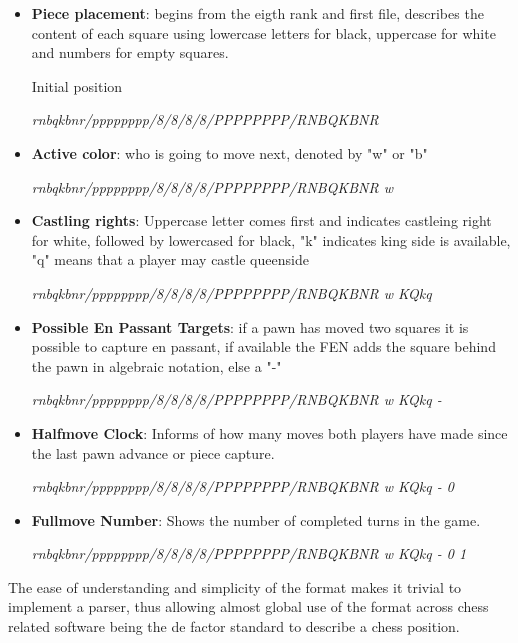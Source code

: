\begin{itemize}
    \item {
        \textbf{Piece placement}: begins from the eigth rank and first file, describes the content of each square using lowercase letters for black, uppercase for white and numbers for empty squares.
        \begin{center}Initial position\end{center}
        \begin{center}
        \textit{rnbqkbnr/pppppppp/8/8/8/8/PPPPPPPP/RNBQKBNR}                    
        \end{center}
    }
    \item {
        \textbf{Active color}: who is going to move next, denoted by "w" or "b"
        \begin{center}
        \textit{rnbqkbnr/pppppppp/8/8/8/8/PPPPPPPP/RNBQKBNR w}                    
        \end{center}
    }
    \item {
        \textbf{Castling rights}: Uppercase letter comes first and indicates castleing right for white, followed by lowercased for black, "k" indicates king side is available, "q" means that a player may castle queenside
        \begin{center}
        \textit{rnbqkbnr/pppppppp/8/8/8/8/PPPPPPPP/RNBQKBNR w KQkq}                    
        \end{center}
    }
    \item {
        \textbf{Possible En Passant Targets}: if a pawn has moved two squares it is possible to capture en passant, if available the FEN adds the square behind the pawn in algebraic notation, else a "-"
        \begin{center}
        \textit{rnbqkbnr/pppppppp/8/8/8/8/PPPPPPPP/RNBQKBNR w KQkq -}                    
        \end{center}
    }
    \item {
        \textbf{Halfmove Clock}: Informs of how many moves both players have made since the last pawn advance or piece capture.
        \begin{center}
        \textit{rnbqkbnr/pppppppp/8/8/8/8/PPPPPPPP/RNBQKBNR w KQkq - 0}                    
        \end{center}
    }
    \item {
        \textbf{Fullmove Number}: Shows the number of completed turns in the game.
        \begin{center}
        \textit{rnbqkbnr/pppppppp/8/8/8/8/PPPPPPPP/RNBQKBNR w KQkq - 0 1}                    
        \end{center}
    }
\end{itemize}
The ease of understanding and simplicity of the format makes it trivial to implement a parser, 
thus allowing almost global use of the format across chess related software being the de factor standard to describe a chess position.


